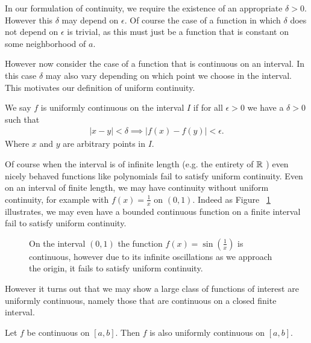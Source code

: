 \documentclass[]{article}
\begin{document}
In our formulation of continuity, we require the existence of an appropriate $\delta > 0$. However this $\delta$ may depend on $\epsilon$. Of course the case of a function in which $\delta$ does not depend on $\epsilon$ is trivial, as this must just be a function that is constant on some neighborhood of $a$.

However now consider the case of a function that is continuous on an interval. In this case $\delta$ may also vary depending on which point we choose in the interval. This motivates our definition of uniform continuity.

\begin{defi} 
	We say $f$ is uniformly continuous on the interval $I$ if for all $\epsilon > 0$ we have a $\delta > 0$ such that 
	\begin{align*}
			|x - y| < \delta \implies |f(x) - f(y)| < \epsilon.
	\end{align*}
	Where $x$ and $y$ are arbitrary points in $I$.
\end{defi}

Of course when the interval is of infinite length (e.g. the entirety of $\mathbb{R}$ ) even nicely behaved functions like polynomials fail to satisfy uniform continuity. Even on an interval of finite length, we may have continuity without uniform continuity, for example with $f(x) = \frac{1}{x}$ on $(0,1)$. Indeed as Figure ~\ref{fig:bounded-non-uniformly-continuous} illustrates, we may even have a bounded continuous function on a finite interval fail to satisfy uniform continuity.

\begin{figure}[ht]
\centering
{}
\caption{On the interval $(0, 1)$ the function $f(x) = \sin(\frac{1}{x})$ is continuous, however due to its infinite oscillations as we approach the origin, it fails to satisfy uniform continuity.}
\label{fig:bounded-non-uniformly-continuous}
\end{figure}

However it turns out that we may show a large class of functions of interest are uniformly continuous, namely those that are continuous on a closed finite interval.

\begin{thm}
		Let $f$ be continuous on $[a,b]$. Then $f$ is also uniformly continuous on $[a,b]$.
\end{thm}
\end{document}
